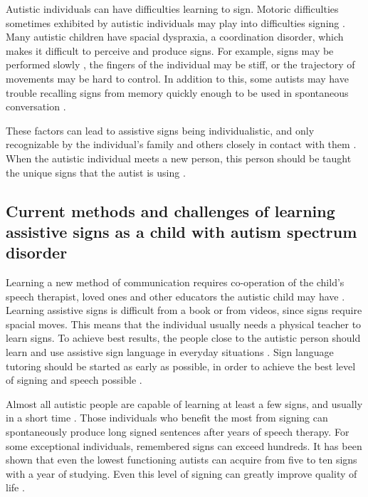 Autistic individuals can have difficulties learning to sign. Motoric difficulties sometimes exhibited by autistic individuals may play into difficulties signing \cite{autismi}. Many autistic children have spacial dyspraxia, a coordination disorder, which makes it difficult to perceive and produce signs. For example, signs may be performed slowly \cite{bonvillian1981sign}, the fingers of the individual may be stiff, or the trajectory of movements may be hard to control. In addition to this, some autists may have trouble recalling signs from memory quickly enough to be used in spontaneous conversation \cite{puheSuomi}.

These factors can lead to assistive signs being individualistic, and only recognizable by the individual's family and others closely in contact with them \cite{autismi}. When the autistic individual meets a new person, this person should be taught the unique signs that the autist is using \cite{puheSuomi}.



\subsection[Current methods and challenges of learning assistive signs as a child with autism spectrum disorder]{Current methods and challenges of learning \\assistive signs as a child with autism spectrum disorder}

Learning a new method of communication requires co-operation of the child's speech therapist, loved ones and other educators the autistic child may have \cite{tetzchner}. Learning assistive signs is difficult from a book or from videos, since signs require spacial moves. This means that the individual usually needs a physical teacher to learn signs. To achieve best results, the people close to the autistic person should learn and use assistive sign language in everyday situations \cite{bonvillian1981sign,puheSuomi}. Sign language tutoring should be started as early as possible, in order to achieve the best level of signing and speech possible \cite{bonvillian1981sign}.

Almost all autistic people are capable of learning at least a few signs, and usually in a short time \cite{bonvillian1981sign, tetzchner}. Those individuals who benefit the most from signing can spontaneously produce long signed sentences after years of speech therapy. For some exceptional individuals, remembered signs can exceed hundreds. It has been shown that even the lowest functioning autists can acquire from five to ten signs with a year of studying. Even this level of signing can greatly improve quality of life \cite{tetzchner}.

